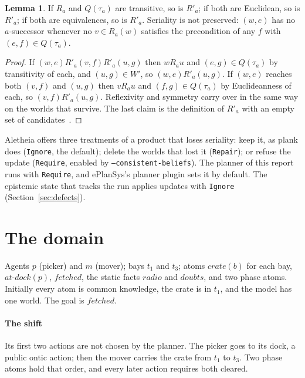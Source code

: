 \documentclass[11pt,a4paper]{article}
\theoremstyle{definition}
\newtheorem{lemma}{Lemma}
\newcommand{\code}[1]{\texttt{\small #1}}
\newcommand{\ag}[1]{\mathit{#1}}
\newcommand{\pk}{\ag{p}}
\newcommand{\mv}{\ag{m}}
\newcommand{\crate}{\mathit{crate}}
\begin{document}
\begin{lemma}
\label{lem:kd45}
If $R_a$ and $Q(\tau_a)$ are transitive, so is $R'_a$; if both are Euclidean, so
is $R'_a$; if both are equivalences, so is $R'_a$. Seriality is not preserved:
$(w,e)$ has no $a$-successor whenever no $v \in R_a(w)$ satisfies the
precondition of any $f$ with $(e,f) \in Q(\tau_a)$.
\end{lemma}

\begin{proof}
If $(w,e) R'_a (v,f) R'_a (u,g)$ then $w R_a u$ and $(e,g) \in Q(\tau_a)$ by
transitivity of each, and $(u,g) \in W'$, so $(w,e) R'_a (u,g)$. If $(w,e)$
reaches both $(v,f)$ and $(u,g)$ then $v R_a u$ and $(f,g) \in Q(\tau_a)$ by
Euclideanness of each, so $(v,f) R'_a (u,g)$. Reflexivity and symmetry carry over
in the same way on the worlds that survive. The last claim is the definition of
$R'_a$ with an empty set of candidates~\cite{vanditmarsch2007}.
\end{proof}

\noindent
Aletheia offers three treatments of a product that loses seriality: keep it, as
plank does (\code{Ignore}, the default); delete the worlds that lost it
(\code{Repair}); or refuse the update (\code{Require}, enabled by
\code{--consistent-beliefs}). The planner of this report runs with
\code{Require}, and ePlanSys's planner plugin sets it by default. The epistemic
state that tracks the run applies updates with \code{Ignore}
(Section~\ref{sec:defects}).

\section{The domain}
\label{sec:domain}

Agents $\pk$ (picker) and $\mv$ (mover); bays $t_1$ and $t_3$; atoms
$\crate(b)$ for each bay, $\mathit{at\text{-}dock}(\pk)$, $\mathit{fetched}$,
the static facts $\mathit{radio}$ and $\mathit{doubts}$, and two phase atoms.
Initially every atom is common knowledge, the crate is in $t_1$, and the model
has one world. The goal is $\mathit{fetched}$.

\paragraph{The shift} Its first two actions are not chosen by the planner. The
picker goes to its dock, a public ontic action; then the mover carries the crate
from $t_1$ to $t_3$. Two phase atoms hold that order, and every later action
requires both cleared.
\end{document}
